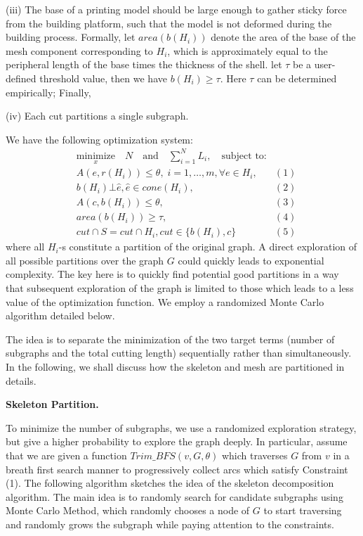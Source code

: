(iii) The base of a printing model should be large enough to gather sticky force from the building platform, such that the model is not deformed during the building process. Formally, let $area(b(H_i))$ denote the area of the base of the mesh component corresponding to $H_i$, which is approximately equal to the peripheral length of the base times the thickness of the shell. let $\tau$ be a user-defined threshold value, then we have $b(H_i) \geq \tau$. Here $\tau$ can be determined empirically; Finally,


(iv) Each cut partitions a single subgraph.

We have the following optimization system:
\begin{equation*}
\begin{aligned}
& \underset{x}{\text{minimize}} \quad N \quad \text{and} \quad \sum_{i=1}^N{L_i},
\quad \text{subject to:} \\
& A(e, r(H_i)) \leq \theta, \; i = 1, \ldots, m, \forall e \in H_i, & (1)\\
& b(H_i) \bot \hat{e}, \hat{e} \in cone(H_i), & (2)\\
& A(c, b(H_i)) \leq \theta, & (3)\\
& area(b(H_i)) \geq \tau, & (4)\\
& cut \cap S = cut \cap H_i, cut \in \{b(H_i), c\}  & (5)
\end{aligned}
\end{equation*}
where all $H_i$-s constitute a partition of the original graph. A direct exploration of all possible partitions over the graph $G$ could quickly leads to exponential complexity. The key here is to quickly find potential good partitions in a way that subsequent exploration of the graph is limited to those which leads to a less value of the optimization function. We employ a randomized Monte Carlo algorithm detailed below.

The idea is to separate the minimization of the two target terms (number of subgraphs and the total cutting length) sequentially rather than simultaneously. In the following, we shall discuss how the skeleton and mesh are partitioned in details.

\textbf{Skeleton Partition.}

 To minimize the number of subgraphs, we use a randomized exploration strategy, but give a higher probability to explore the graph deeply. In particular, assume that we are given a function $Trim\_BFS(v, G, \theta)$ which traverses $G$ from $v$ in a breath first search manner to progressively collect arcs which satisfy Constraint (1). The following algorithm sketches the idea of the skeleton decomposition algorithm. The main idea is to randomly search for candidate subgraphs using Monte Carlo Method, which randomly chooses a node of $G$ to start traversing and randomly grows the subgraph while paying attention to the constraints.

